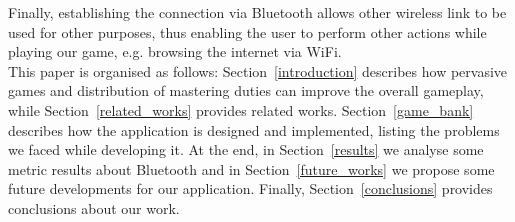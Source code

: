 Finally, establishing the connection via Bluetooth
allows other wireless link to be used for other purposes, thus enabling the
user to perform other actions while playing our game, e.g. browsing the
internet via WiFi.\\

This paper is organised as follows: Section~\ref{introduction} describes how 
pervasive games and distribution of mastering duties can improve the overall 
gameplay, while Section~\ref{related_works} provides related works. 
Section~\ref{game_bank} describes how the application is designed and 
implemented, listing the problems we faced while developing it. At the end, in 
Section~\ref{results} we analyse some metric results about Bluetooth and in 
Section~\ref{future_works} we propose some future developments for our 
application. Finally, Section~\ref{conclusions} provides conclusions about our 
work.
